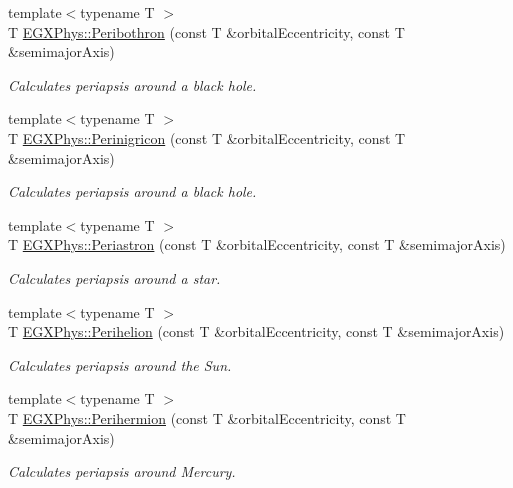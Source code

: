 \begin{DoxyCompactItemize}
{\footnotesize template$<$typename T $>$ }\\T \mbox{\hyperlink{group___e_g_x_phys-_periapsis_gada5892309279a3a687c4eb2f88238e4e}{E\+G\+X\+Phys\+::\+Peribothron}} (const T \&orbital\+Eccentricity, const T \&semimajor\+Axis)
\begin{DoxyCompactList}\small\item\em Calculates periapsis around a black hole. \end{DoxyCompactList}\item 
{\footnotesize template$<$typename T $>$ }\\T \mbox{\hyperlink{group___e_g_x_phys-_periapsis_ga99d86af90179994e17158b082c502fd4}{E\+G\+X\+Phys\+::\+Perinigricon}} (const T \&orbital\+Eccentricity, const T \&semimajor\+Axis)
\begin{DoxyCompactList}\small\item\em Calculates periapsis around a black hole. \end{DoxyCompactList}\item 
{\footnotesize template$<$typename T $>$ }\\T \mbox{\hyperlink{group___e_g_x_phys-_periapsis_ga477de6824cbb5986cdae923141e21648}{E\+G\+X\+Phys\+::\+Periastron}} (const T \&orbital\+Eccentricity, const T \&semimajor\+Axis)
\begin{DoxyCompactList}\small\item\em Calculates periapsis around a star. \end{DoxyCompactList}\item 
{\footnotesize template$<$typename T $>$ }\\T \mbox{\hyperlink{group___e_g_x_phys-_periapsis_ga941d285e3a0b48ada9c9f60925ff63c2}{E\+G\+X\+Phys\+::\+Perihelion}} (const T \&orbital\+Eccentricity, const T \&semimajor\+Axis)
\begin{DoxyCompactList}\small\item\em Calculates periapsis around the Sun. \end{DoxyCompactList}\item 
{\footnotesize template$<$typename T $>$ }\\T \mbox{\hyperlink{group___e_g_x_phys-_periapsis_ga9562e9cbfd73019ae9cdaa643b843d63}{E\+G\+X\+Phys\+::\+Perihermion}} (const T \&orbital\+Eccentricity, const T \&semimajor\+Axis)
\begin{DoxyCompactList}\small\item\em Calculates periapsis around Mercury. \end{DoxyCompactList}\item 

\end{DoxyCompactItemize}
